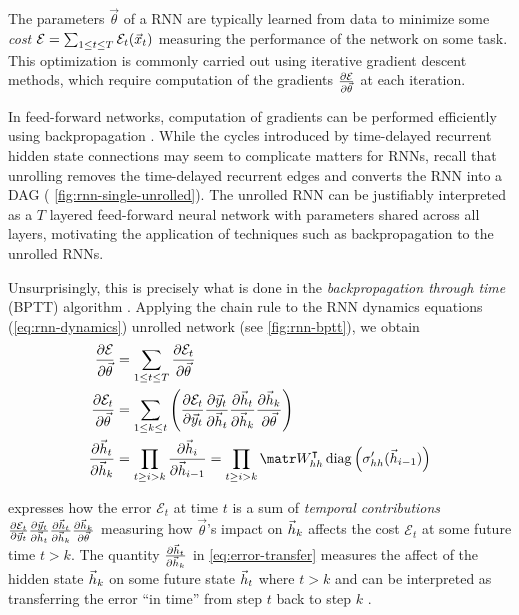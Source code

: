 The parameters $\vec{\theta}$ of a RNN are typically learned from data to
minimize some \emph{cost} $\mathcal{E} = \sum_{1 \leq t \leq T} \mathcal{E}_t(\vec{x}_t)$
measuring the performance of the network on some task. This optimization is
commonly carried out using iterative gradient descent methods, which require
computation of the gradients $\frac{\partial \mathcal{E}}{\partial \vec{\theta}}$ at each
iteration.

In feed-forward networks, computation of gradients can be performed efficiently
using backpropagation
\citep{bryson1963optimal,linnainmaa1970representation,rumelhart1988learning}.
While the cycles introduced by time-delayed recurrent hidden state connections
may seem to complicate matters for RNNs, recall that unrolling removes the
time-delayed recurrent edges and converts the RNN into a DAG (\eg
\vref{fig:rnn-single-unrolled}). The unrolled RNN can be justifiably
interpreted as a $T$ layered feed-forward neural network with parameters shared
across all layers, motivating the application of techniques such as
backpropagation to the unrolled RNNs.

Unsurprisingly, this is precisely what is done in the \emph{backpropagation
through time} (BPTT) algorithm \citep{goller1996learning}. Applying the
chain rule to the RNN dynamics equations (\vref{eq:rnn-dynamics})
unrolled network (see \cref{fig:rnn-bptt}), we obtain
\begin{align}
  \frac{\pd \mathcal{E}}{\pd \vec{\theta}} &= \sum_{1 \leq t \leq T} \frac{\pd \mathcal{E}_t}{\pd \vec{\theta}} \label{eq:err-total}\\
    \frac{\pd \mathcal{E}_t}{\pd \vec{\theta}} &= \sum_{1 \leq k \leq t} \left(
        \frac{\pd \mathcal{E}_t}{\pd \y_t}
        \frac{\pd \y_t}{\pd \h_t}
        \frac{\pd \h_t}{\pd \h_k}
        \frac{\pd \h_k}{\pd \vec{\theta}}
    \right) \label{eq:error-t}\\
    \frac{\pd \h_t}{\pd \h_k} &=
    \prod_{t \geq i > k} \frac{\pd \h_i}{\pd \h_{i-1}}
    = \prod_{t \geq i > k} \W_{hh}^\tp \diag \left( \sigma_{hh}'( \h_{i-1} ) \right)
    \label{eq:error-transfer}
\end{align}

 expresses how the error $\mathcal{E}_t$ at time $t$ is a sum
of \emph{temporal contributions} $
\frac{\partial \mathcal{E}_t}{\partial \vec{y}_t}
\frac{\partial \vec{y}_t}{\partial \vec{h}_t}
\frac{\partial \vec{h}_t}{\partial \vec{h}_k}
\frac{\partial \vec{h}_k}{\partial \vec{\theta}}$
measuring how $\vec{\theta}$'s impact on $\vec{h}_k$ affects the cost
$\mathcal{E}_t$ at some future time $t > k$. The quantity
$\frac{\partial \vec{h}_t}{\partial \vec{h}_k}$ in \cref{eq:error-transfer} measures the affect of
the hidden state $\vec{h}_k$ on some future state $\vec{h}_t$ where $t > k$ and can be
interpreted as transferring the error ``in time'' from step $t$ back to step
$k$ \citep{Pascanu2012}.

